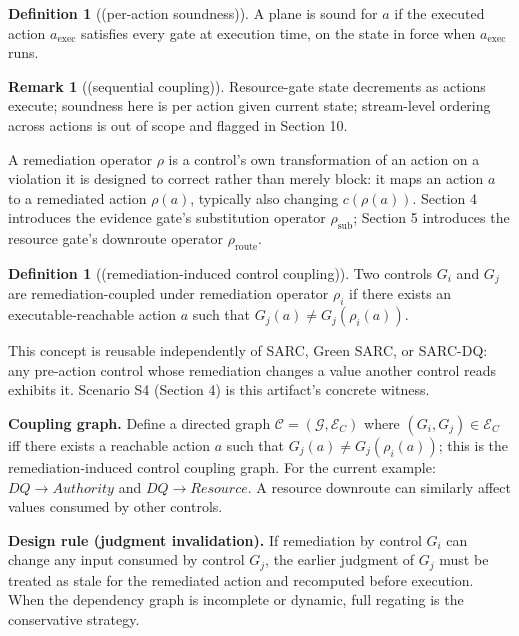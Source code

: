 \documentclass[11pt,a4paper]{article}
\theoremstyle{definition}
\newtheorem{definition}{Definition}
\newtheorem*{definitionstar}{Definition}
\newtheorem*{remark}{Remark}
\newcommand{\rhosub}{\rho_{\mathrm{sub}}}
\newcommand{\rhoroute}{\rho_{\mathrm{route}}}
\begin{document}
\setcounter{definition}{2}
\begin{definition}[(per-action soundness)]
A plane is sound for $a$ if the executed action $a_{\mathrm{exec}}$ satisfies every gate at execution time, on the state in force when $a_{\mathrm{exec}}$ runs.
\end{definition}

\begin{remark}[(sequential coupling)]
Resource-gate state decrements as actions execute; soundness here is per action given current state; stream-level ordering across actions is out of scope and flagged in Section 10.
\end{remark}

A remediation operator $\rho$ is a control's own transformation of an action on a violation it is designed to correct rather than merely block: it maps an action $a$ to a remediated action $\rho(a)$, typically also changing $c(\rho(a))$. Section 4 introduces the evidence gate's substitution operator $\rhosub$; Section 5 introduces the resource gate's downroute operator $\rhoroute$.

\begin{definitionstar}[(remediation-induced control coupling)]
Two controls $G_i$ and $G_j$ are remediation-coupled under remediation operator $\rho_i$ if there exists an executable-reachable action $a$ such that $G_j(a) \neq G_j(\rho_i(a))$.
\end{definitionstar}

\noindent This concept is reusable independently of SARC, Green SARC, or SARC-DQ: any pre-action control whose remediation changes a value another control reads exhibits it. Scenario S4 (Section 4) is this artifact's concrete witness.

\noindent\textbf{Coupling graph.} Define a directed graph $\mathcal{C} = (\mathcal{G}, \mathcal{E}_C)$ where $(G_i, G_j) \in \mathcal{E}_C$ iff there exists a reachable action $a$ such that $G_j(a) \neq G_j(\rho_i(a))$; this is the remediation-induced control coupling graph. For the current example: $DQ \to Authority$ and $DQ \to Resource$. A resource downroute can similarly affect values consumed by other controls.

\noindent\textbf{Design rule (judgment invalidation).} If remediation by control $G_i$ can change any input consumed by control $G_j$, the earlier judgment of $G_j$ must be treated as stale for the remediated action and recomputed before execution. When the dependency graph is incomplete or dynamic, full regating is the conservative strategy.
\end{document}

